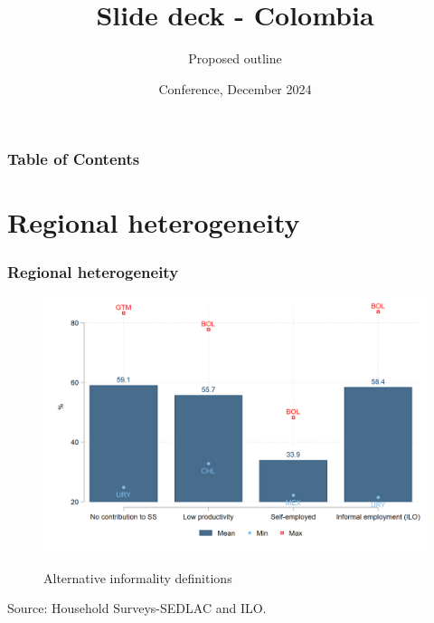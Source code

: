 \documentclass{beamer}
\title[Slide deck - Colombia] %
{Slide deck - Colombia}
\subtitle{Proposed outline}
\institute{World Bank} %
\date[WB 2024] %
{Conference, December 2024}
\begin{document}
\frame{\titlepage}


\begin{frame}
\frametitle{Table of Contents}
\tableofcontents
\end{frame}
\section{Regional heterogeneity}


\begin{frame}
\frametitle{Regional heterogeneity}
\begin{figure}[!htb]
\justifying
  \caption{Alternative informality definitions}
  \centering
  \includegraphics[width=0.8\linewidth]{latex/figures/Snapshot/Alternative informality definitions_CASEN.png}
  \label{fig:informaldefs}
\end{figure}
  \centering
\footnotesize{Source: Household Surveys-SEDLAC and ILO.}


\end{frame}
\end{document}
